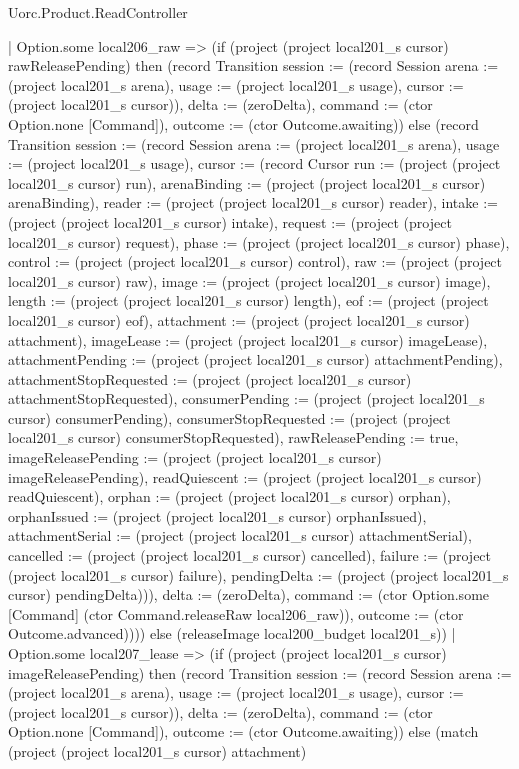\begin{lexlean}{Uorc.Product.ReadController}
\begin{semanticmodule}
{      | Option.some local206_raw => (if (project (project local201_s cursor) rawReleasePending) then (record Transition {session := (record Session {arena := (project local201_s arena), usage := (project local201_s usage), cursor := (project local201_s cursor)}), delta := (zeroDelta), command := (ctor Option.none [Command]), outcome := (ctor Outcome.awaiting)}) else (record Transition {session := (record Session {arena := (project local201_s arena), usage := (project local201_s usage), cursor := (record Cursor {run := (project (project local201_s cursor) run), arenaBinding := (project (project local201_s cursor) arenaBinding), reader := (project (project local201_s cursor) reader), intake := (project (project local201_s cursor) intake), request := (project (project local201_s cursor) request), phase := (project (project local201_s cursor) phase), control := (project (project local201_s cursor) control), raw := (project (project local201_s cursor) raw), image := (project (project local201_s cursor) image), length := (project (project local201_s cursor) length), eof := (project (project local201_s cursor) eof), attachment := (project (project local201_s cursor) attachment), imageLease := (project (project local201_s cursor) imageLease), attachmentPending := (project (project local201_s cursor) attachmentPending), attachmentStopRequested := (project (project local201_s cursor) attachmentStopRequested), consumerPending := (project (project local201_s cursor) consumerPending), consumerStopRequested := (project (project local201_s cursor) consumerStopRequested), rawReleasePending := true, imageReleasePending := (project (project local201_s cursor) imageReleasePending), readQuiescent := (project (project local201_s cursor) readQuiescent), orphan := (project (project local201_s cursor) orphan), orphanIssued := (project (project local201_s cursor) orphanIssued), attachmentSerial := (project (project local201_s cursor) attachmentSerial), cancelled := (project (project local201_s cursor) cancelled), failure := (project (project local201_s cursor) failure), pendingDelta := (project (project local201_s cursor) pendingDelta)})}), delta := (zeroDelta), command := (ctor Option.some [Command] (ctor Command.releaseRaw local206_raw)), outcome := (ctor Outcome.advanced)}))) else (releaseImage local200_budget local201_s))
    | Option.some local207_lease => (if (project (project local201_s cursor) imageReleasePending) then (record Transition {session := (record Session {arena := (project local201_s arena), usage := (project local201_s usage), cursor := (project local201_s cursor)}), delta := (zeroDelta), command := (ctor Option.none [Command]), outcome := (ctor Outcome.awaiting)}) else (match (project (project local201_s cursor) attachment)
}
\end{semanticmodule}
\end{lexlean}
